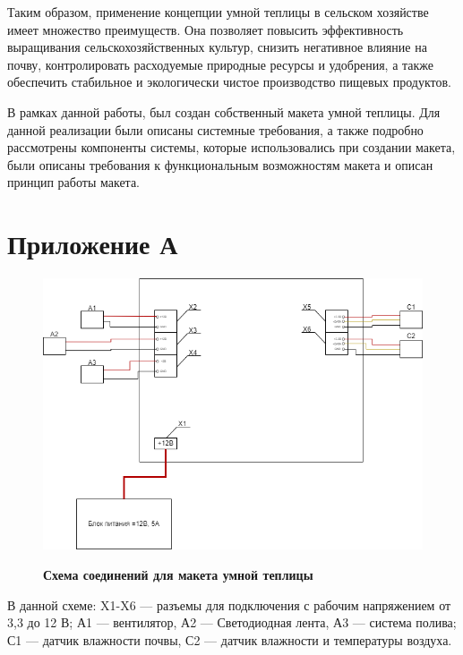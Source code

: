 \documentclass{altsu-bachelor}
\begin{document}
Таким образом, применение концепции умной теплицы в сельском хозяйстве имеет множество преимуществ. Она позволяет повысить эффективность выращивания сельскохозяйственных культур, снизить негативное влияние на почву, контролировать расходуемые природные ресурсы и удобрения, а также обеспечить стабильное и экологически чистое производство пищевых продуктов.


В рамках данной работы, был создан собственный макета умной теплицы. Для данной реализации были описаны системные требования, а также подробно рассмотрены компоненты системы, которые использовались при создании макета, были описаны требования к функциональным возможностям макета и описан принцип работы макета.

\newpage
{}
\printbibliography[title={Список литературы}]

\chapter*{Приложение А}

\begin{figure}[H]
    \centering
    \caption*{\textbf{Схема соединений для макета умной теплицы}}
    \includegraphics[scale=0.7]{images/connections_schem.png}
    \label{fig:connection_schem}
\end{figure}

В данной схеме: X1-X6 --- разъемы для подключения с рабочим напряжением от 3,3 до 12 В; А1 --- вентилятор, А2 --- Светодиодная лента, А3 --- система полива; С1 --- датчик влажности почвы, С2 --- датчик влажности и температуры воздуха.
\end{document}
